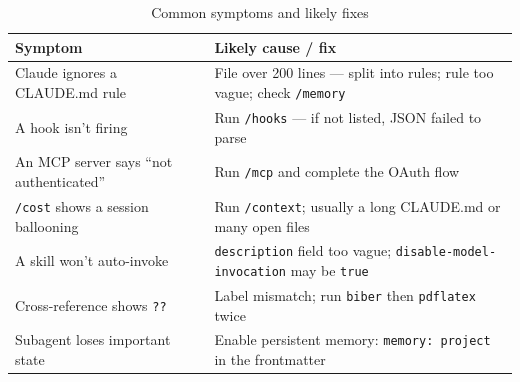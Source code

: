 \begin{table}[ht]
\centering
\caption{Common symptoms and likely fixes}
\label{tab:app-trouble}
\begin{tabularx}{\textwidth}{Xl}
\toprule
\textbf{Symptom} & \textbf{Likely cause / fix} \\
\midrule
Claude ignores a CLAUDE.md rule
  & File over 200 lines — split into rules; rule too vague; check \texttt{/memory} \\
A hook isn't firing
  & Run \texttt{/hooks} — if not listed, JSON failed to parse \\
An MCP server says ``not authenticated''
  & Run \texttt{/mcp} and complete the OAuth flow \\
\texttt{/cost} shows a session ballooning
  & Run \texttt{/context}; usually a long CLAUDE.md or many open files \\
A skill won't auto-invoke
  & \texttt{description} field too vague; \texttt{disable-model-invocation} may be \texttt{true} \\
Cross-reference shows \texttt{??}
  & Label mismatch; run \texttt{biber} then \texttt{pdflatex} twice \\
Subagent loses important state
  & Enable persistent memory: \texttt{memory: project} in the frontmatter \\
\bottomrule
\end{tabularx}
\end{table}

\nocite{*}
\printbibliography[heading=subbibliography,title={References}]
